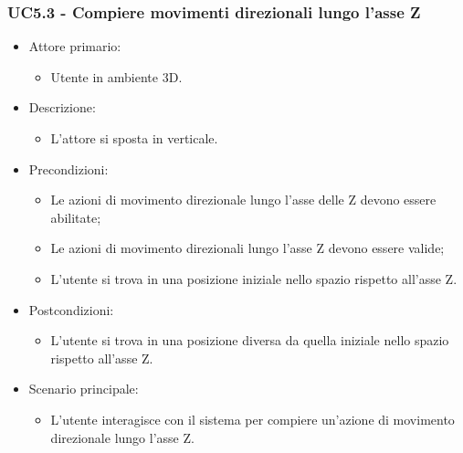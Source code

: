 \subsubsection{UC5.3 - Compiere movimenti direzionali lungo l'asse Z}
\begin{itemize}

	\item Attore primario: 
	\begin{itemize}
		\item Utente in ambiente 3D.
	\end{itemize}
	\item Descrizione:
	\begin{itemize}
		\item  L'attore si sposta in verticale.
	\end{itemize}
	
	\item Precondizioni:
	\begin{itemize}
		\item Le azioni di movimento direzionale lungo l'asse delle Z devono essere abilitate;
		\item Le azioni di movimento direzionali lungo l'asse Z devono essere valide;
		\item L'utente si trova in una posizione iniziale nello spazio rispetto all'asse Z.
	\end{itemize}
	
	\item Postcondizioni:
	\begin{itemize}
		\item L'utente si trova in una posizione diversa da quella iniziale nello spazio rispetto all'asse Z.
	\end{itemize}
	
	\item Scenario principale:
	\begin{itemize}
		\item L'utente interagisce con il sistema per compiere un'azione di movimento direzionale lungo l'asse Z.
	\end{itemize}
	
\end{itemize}

\pagebreak

